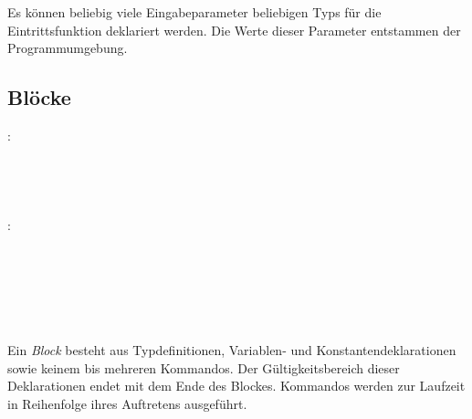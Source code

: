 Es können beliebig viele Eingabeparameter beliebigen Typs für die Eintrittsfunktion deklariert werden.
Die Werte dieser Parameter entstammen der Programmumgebung.


\subsection{Blöcke}\label{Bloecke}
:\label{block}\\
\hspace*{1cm} \Gspace{}\\
\hspace*{1cm} \Gspace\Gt{;}\Gspace{}\\
\hspace*{1cm} \Gspace\Gt{;}\Gspace{}\\
\hspace*{1cm} \Gspace{}\\
:\label{kommando}\\
\hspace*{1cm} \Gspace\Gt{;}\\
\hspace*{1cm}\Gspace{}\Gspace\Gt{;}\\
\hspace*{1cm} \\
\hspace*{1cm} \\
\hspace*{1cm} \\
\hspace*{1cm}\Gt{\{}\Gspace{}\Gspace\Gt{\}}\\

Ein \emph{Block} besteht aus Typdefinitionen, Variablen- und Konstantendeklarationen sowie keinem bis mehreren Kommandos.
Der Gültigkeitsbereich dieser Deklarationen endet mit dem Ende des Blockes. Kommandos werden zur Laufzeit in Reihenfolge ihres
Auftretens ausgeführt.


